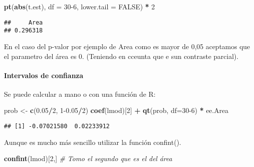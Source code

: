 \documentclass[
]{article}
\newenvironment{Shaded}{\begin{snugshade}}{\end{snugshade}}
\newcommand{\AttributeTok}[1]{\textcolor[rgb]{0.13,0.29,0.53}{#1}}
\newcommand{\CommentTok}[1]{\textcolor[rgb]{0.56,0.35,0.01}{\textit{#1}}}
\newcommand{\ConstantTok}[1]{\textcolor[rgb]{0.56,0.35,0.01}{#1}}
\newcommand{\DecValTok}[1]{\textcolor[rgb]{0.00,0.00,0.81}{#1}}
\newcommand{\FloatTok}[1]{\textcolor[rgb]{0.00,0.00,0.81}{#1}}
\newcommand{\FunctionTok}[1]{\textcolor[rgb]{0.13,0.29,0.53}{\textbf{#1}}}
\newcommand{\NormalTok}[1]{#1}
\newcommand{\OtherTok}[1]{\textcolor[rgb]{0.56,0.35,0.01}{#1}}
\newcommand{\SpecialCharTok}[1]{\textcolor[rgb]{0.81,0.36,0.00}{\textbf{#1}}}
\begin{document}
\begin{Shaded}
\begin{Highlighting}[]
\FunctionTok{pt}\NormalTok{(}\FunctionTok{abs}\NormalTok{(t.est), }\AttributeTok{df =} \DecValTok{30{-}6}\NormalTok{, }\AttributeTok{lower.tail =} \ConstantTok{FALSE}\NormalTok{) }\SpecialCharTok{*} \DecValTok{2}
\end{Highlighting}
\end{Shaded}

\begin{verbatim}
##     Area 
## 0.296318
\end{verbatim}

En el caso del p-valor por ejemplo de Area como es mayor de 0,05
aceptamos que el parametro del área es 0. (Teniendo en cceunta que e sun
contraste parcial).

\hypertarget{intervalos-de-confianza}{%
\paragraph{Intervalos de confianza}\label{intervalos-de-confianza}}

Se puede calcular a mano o con una función de R:

\begin{Shaded}
\begin{Highlighting}[]
\NormalTok{prob }\OtherTok{\textless{}{-}} \FunctionTok{c}\NormalTok{(}\FloatTok{0.05}\SpecialCharTok{/}\DecValTok{2}\NormalTok{, }\DecValTok{1}\FloatTok{{-}0.05}\SpecialCharTok{/}\DecValTok{2}\NormalTok{)}
\FunctionTok{coef}\NormalTok{(lmod)[}\DecValTok{2}\NormalTok{] }\SpecialCharTok{+} \FunctionTok{qt}\NormalTok{(prob, }\AttributeTok{df=}\DecValTok{30{-}6}\NormalTok{) }\SpecialCharTok{*}\NormalTok{ ee.Area}
\end{Highlighting}
\end{Shaded}

\begin{verbatim}
## [1] -0.07021580  0.02233912
\end{verbatim}

Aunque es mucho más sencillo utilizar la función confint().

\begin{Shaded}
\begin{Highlighting}[]
\FunctionTok{confint}\NormalTok{(lmod)[}\DecValTok{2}\NormalTok{,] }\CommentTok{\# Tomo el segundo que es el del área}
\end{Highlighting}
\end{Shaded}
\end{document}
